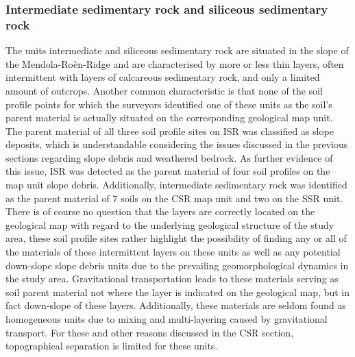 \documentclass[preprint,12pt,authoryear]{elsarticle}
\begin{document}
\subsubsection{Intermediate sedimentary rock and siliceous sedimentary rock}
The units intermediate and siliceous sedimentary rock are situated in the slope of the Mendola-Ro\`en-Ridge and are characterised by  more or less thin layers, often intermittent with layers of calcareous sedimentary rock, and only a limited amount of outcrops. Another common characteristic is that none of the soil profile points for which the surveyors identified one of these units as the soil's parent material is actually situated on the corresponding geological map unit. The parent material of all three soil profile sites on ISR was classified as slope deposits, which is understandable considering the issues discussed in the previous sections regarding slope debris and weathered bedrock. As further evidence of this issue, ISR was detected as the parent material of four soil profiles on the map unit slope debris. Additionally, intermediate sedimentary rock was identified as the parent material of 7 soils on the CSR map unit and two on the SSR unit. There is of course no question that the layers are correctly located on the geological map with regard to the underlying geological structure of the study area, these soil profile sites rather highlight the possibility of finding any or all of the materials of these intermittent layers on these units as well as any potential down-slope slope debris units due to the prevailing geomorphological dynamics in the study area. Gravitational transportation leads  to these materials serving as soil parent material not where the layer is indicated on the geological map, but in fact down-slope of these layers. Additionally, these materials are seldom found as homogeneous units due to mixing and multi-layering caused by gravitational transport. For these and other reasons discussed in the CSR section, topographical separation is limited for these units. 
\end{document}
